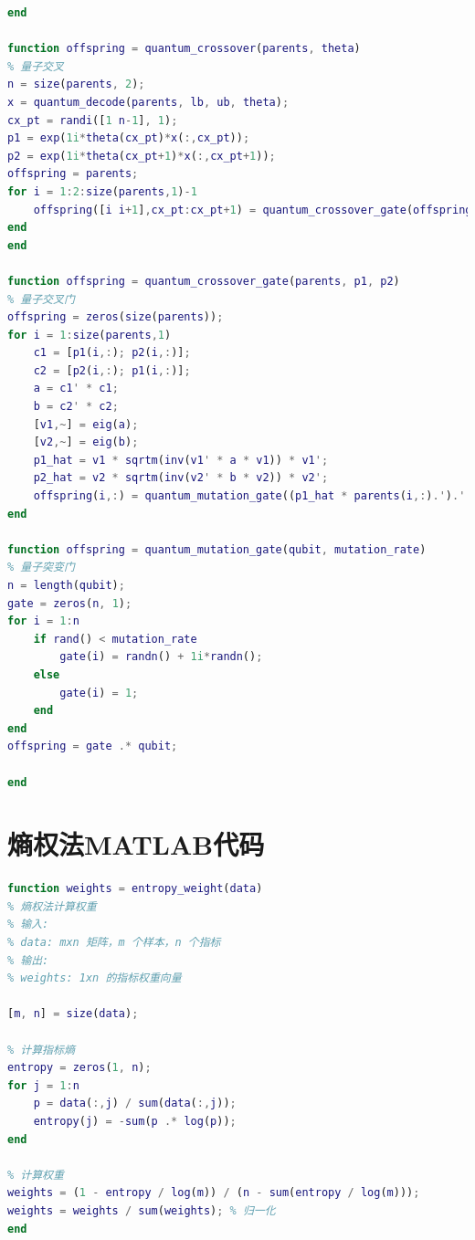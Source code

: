 \documentclass{MathorCupmodeling}
\begin{document}
\begin{lstlisting}[language=Matlab]
end

function offspring = quantum_crossover(parents, theta)
% 量子交叉
n = size(parents, 2);
x = quantum_decode(parents, lb, ub, theta);
cx_pt = randi([1 n-1], 1);
p1 = exp(1i*theta(cx_pt)*x(:,cx_pt));
p2 = exp(1i*theta(cx_pt+1)*x(:,cx_pt+1));
offspring = parents;
for i = 1:2:size(parents,1)-1
    offspring([i i+1],cx_pt:cx_pt+1) = quantum_crossover_gate(offspring([i i+1],cx_pt:cx_pt+1), p1(i:i+1,:), p2(i:i+1,:));
end
end

function offspring = quantum_crossover_gate(parents, p1, p2)
% 量子交叉门
offspring = zeros(size(parents));
for i = 1:size(parents,1)
    c1 = [p1(i,:); p2(i,:)];
    c2 = [p2(i,:); p1(i,:)];
    a = c1' * c1;
    b = c2' * c2;
    [v1,~] = eig(a);
    [v2,~] = eig(b);
    p1_hat = v1 * sqrtm(inv(v1' * a * v1)) * v1';
    p2_hat = v2 * sqrtm(inv(v2' * b * v2)) * v2';
    offspring(i,:) = quantum_mutation_gate((p1_hat * parents(i,:).').' + (p2_hat * parents(i,:).').', 0.1);
end

function offspring = quantum_mutation_gate(qubit, mutation_rate)
% 量子突变门
n = length(qubit);
gate = zeros(n, 1);
for i = 1:n
    if rand() < mutation_rate
        gate(i) = randn() + 1i*randn();
    else
        gate(i) = 1;
    end
end
offspring = gate .* qubit;

end
\end{lstlisting}
\section{熵权法MATLAB代码}
\begin{lstlisting}[language=Matlab]
function weights = entropy_weight(data)
% 熵权法计算权重
% 输入:
% data: mxn 矩阵，m 个样本，n 个指标
% 输出:
% weights: 1xn 的指标权重向量

[m, n] = size(data);

% 计算指标熵
entropy = zeros(1, n);
for j = 1:n
    p = data(:,j) / sum(data(:,j));
    entropy(j) = -sum(p .* log(p));
end

% 计算权重
weights = (1 - entropy / log(m)) / (n - sum(entropy / log(m)));
weights = weights / sum(weights); % 归一化
end

\end{lstlisting}
\end{document}
